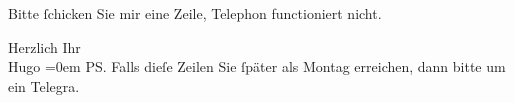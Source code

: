 \pstart
           Bitte ſchicken Sie mir eine Zeile, Telephon functioniert nicht.\pend
           
\pstart
           Herzlich Ihr{\\[\baselineskip]}\spacefill\mbox{Hugo}\pend
           \leftskip=0em{}
\pstart
           {\pb}\textsc{PS}. Falls dieſe Zeilen Sie ſpäter als Montag erreichen,
               dann bitte um ein Telegra{\geminationm}.\pend
           \endnumbering{}  
      